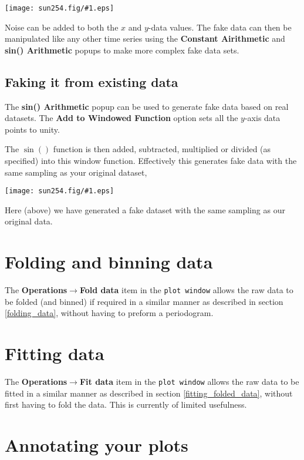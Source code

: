 \documentclass[twoside,11pt]{article}
\newcommand{\htmladdimg}[1]{}
\newcommand{\latexhtml}[2]{#1}
\newcommand{\xlabel}[1]{}
\renewcommand{\_}{\texttt{\symbol{95}}}
\newcommand{\mainfigure}[1]
{\begin{center}
 \latexhtml{\texttt{[image: sun254.fig/\#1.eps]}}{\htmladdimg{../sun254.fig/#1.gif}}
 \end{center}
}
\newcommand{\menuitem}[1]{\textbf{#1}}
\newcommand{\submenuitem}[2]{\latexhtml{\textbf{#1$\rightarrow$#2}}{\textbf{#1=>#2}}}
\newcommand{\labelitem}[1]{\textbf{#1}}
\newcommand{\hitext}[1]{\texttt{#1}}
\begin{document}
\mainfigure{fake_data}

Noise can be added to both the $x$ and $y$-data values. The fake data can then be manipulated like any other time series using the \menuitem{Constant Airithmetic} and \menuitem{sin() Arithmetic} popups to make more complex fake data sets.

\subsection{Faking it from existing data\xlabel{fake_from_data}}

The \labelitem{sin() Arithmetic} popup can be used to generate fake data based on real datasets. The \labelitem{Add to Windowed Function} option sets all the $y$-axis data points to unity.

The $\sin()$ function is then added, subtracted, multiplied or divided (as specified) into this window function. Effectively this generates fake data with the same sampling as your original dataset, 

\mainfigure{window_data}

Here (above) we have generated a fake dataset with the same sampling as our original data.

\section{Folding and binning data\xlabel{folding_and_binning}}

The \submenuitem{Operations}{Fold data} item in the \hitext{plot window} allows the raw data to be folded (and binned) if required in a similar manner as described in section \ref{folding_data}, without having to preform a periodogram.

\section{Fitting data\xlabel{fitting_data}}

The \submenuitem{Operations}{Fit data} item in the \hitext{plot window} allows the raw data to be fitted in a similar manner as described in section \ref{fitting_folded_data}, without first having to fold the data. This is currently of limited usefulness.

\section{Annotating your plots\xlabel{annotating your plots}}
\end{document}
